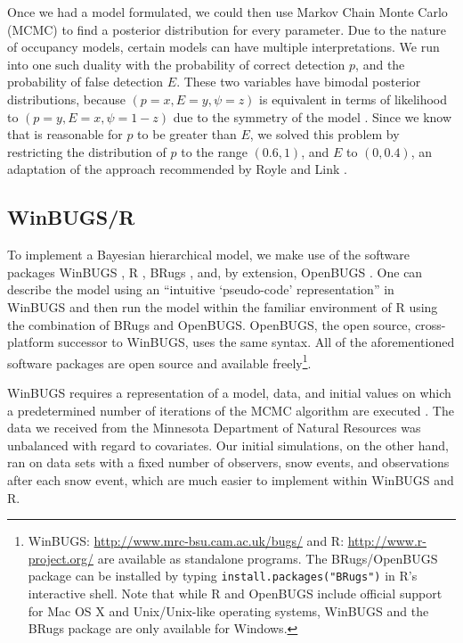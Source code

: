 \documentclass[12pt]{article}
\begin{document}
    Once we had a model formulated, we could then use Markov Chain Monte Carlo
    (MCMC) to find a posterior distribution for every parameter. Due to the
    nature of occupancy models, certain models can have multiple
    interpretations.
    We run into one such duality with the probability of correct detection
    \(p\), and the probability of false detection \(E\). These two variables
    have bimodal posterior distributions, because \((p=x,E=y,\psi=z)\) is
    equivalent in terms of likelihood to \((p=y,E=x,\psi=1-z)\) due to the
    symmetry of the model \cite{Royle2006}.  Since we know that is reasonable
    for \(p\) to be greater than \(E\), we solved this problem by restricting
    the distribution of \(p\) to the range \((0.6,1)\), and \(E\) to
    \((0,0.4)\), an adaptation of the approach recommended by Royle and
    Link \cite{Royle2006}.

    \subsection{WinBUGS/R}
    To implement a Bayesian hierarchical model, we make use of the software
    packages WinBUGS \cite{Lunn2000}, R \cite{R2009}, BRugs \cite{Thomas2008},
    and, by extension, OpenBUGS \cite{Thomas2006}. One can describe the model
    using an ``intuitive `pseudo-code' representation'' in WinBUGS
    \cite{MacKenzie2006} and then run the model within the familiar environment
    of R using the combination of BRugs and OpenBUGS. OpenBUGS, the open source,
    cross-platform successor to WinBUGS, uses the same syntax. All of the
    aforementioned software packages are open source and available
    freely\footnote{WinBUGS: \url{http://www.mrc-bsu.cam.ac.uk/bugs/} and R:
    \url{http://www.r-project.org/} are available as standalone programs. The
    BRugs/OpenBUGS package can be installed by typing
    \texttt{install.packages("BRugs")} in R's interactive shell. Note that while
    R and OpenBUGS include official support for Mac OS X and Unix/Unix-like
    operating systems, WinBUGS and the BRugs package are only available for
    Windows.}.

    WinBUGS requires a representation of a model, data, and initial values on
    which a predetermined number of iterations of the MCMC algorithm are
    executed \cite{MacKenzie2006}.
    The data we received from the
    Minnesota Department of Natural Resources was unbalanced with regard to
    covariates.
    Our initial simulations, on the other
    hand, ran on data sets with a fixed number of observers, snow events, and
    observations after each snow event, which are much easier to implement
    within WinBUGS and R.
\end{document}
